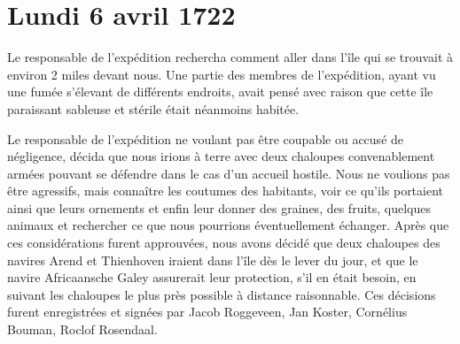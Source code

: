 \documentclass{article}
\begin{document}
            
        \section{Lundi 6 avril 1722}
    
            
        
    Le responsable de l'expédition rechercha comment aller dans l'île qui se trouvait à environ 2 miles devant nous. Une partie des membres de l'expédition, ayant vu une fumée s'élevant de différents endroits, avait pensé avec raison que cette île paraissant sableuse et stérile était néanmoins habitée.
            
        
    Le responsable de l'expédition ne voulant pas être coupable ou accusé de négligence, décida que nous irions à terre avec deux chaloupes convenablement armées pouvant se défendre dans le cas d'un accueil hostile. Nous ne voulions pas être agressifs, mais connaître les coutumes des habitants, voir ce qu'ils portaient ainsi que leurs ornements et enfin leur donner des graines, des fruits, quelques animaux et rechercher ce que nous pourrions éventuellement échanger. Après que ces considérations furent approuvées, nous avons décidé que deux chaloupes des navires Arend et Thienhoven iraient dans l'île dès le lever du jour, et que le navire Africaansche Galey assurerait leur protection, s'il en était besoin, en suivant les chaloupes le plus près possible à distance raisonnable. Ces décisions furent enregistrées et signées par Jacob Roggeveen, Jan Koster, Cornélius Bouman, Roclof Rosendaal.
            
\end{document}
